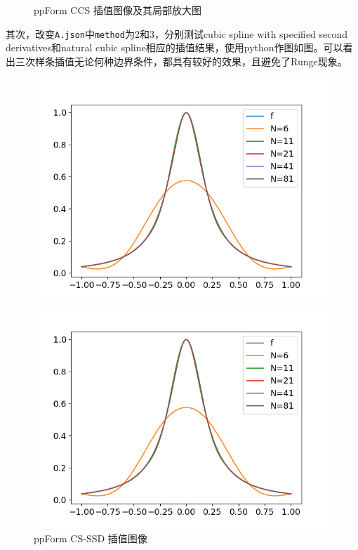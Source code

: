 \documentclass{ctexart}
\begin{document}
\begin{sloppypar}
\begin{figure}[H]
\begin{minipage}[t]{0.5\linewidth}
  \end{minipage}
  \caption{ppForm CCS 插值图像及其局部放大图}
  \label{fig1}
\end{figure}
其次，改变\verb|A.json|中\verb|method|为2和3，分别测试cubic spline with specified second derivatives和natural cubic spline相应的插值结果，使用python作图如图。可以看出三次样条插值无论何种边界条件，都具有较好的效果，且避免了Runge现象。
\begin{figure}[H]
  \begin{minipage}[t]{0.5\linewidth}
    \centering
    \includegraphics[scale = 0.45]{fig//ProblemA_ppForm_23.png}
    \caption{ppForm CS-SSD 插值图像}
  \end{minipage}
  \begin{minipage}[t]{0.5\linewidth}
    \centering
    \includegraphics[scale = 0.45]{fig//ProblemA_ppForm_33.png}

\end{minipage}
\end{figure}
\end{sloppypar}
\end{document}
